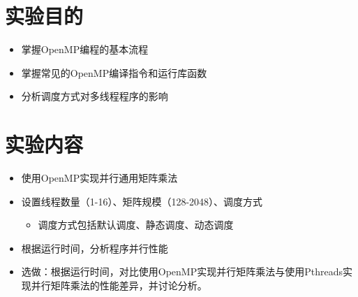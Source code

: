 \documentclass{SYSUReport}
\date{2025年5月4日}
\begin{document}
\cover
\thispagestyle{empty} %
\clearpage



\section{实验目的}
\begin{itemize}
    \item 掌握OpenMP编程的基本流程
    \item 掌握常见的OpenMP编译指令和运行库函数
    \item 分析调度方式对多线程程序的影响
\end{itemize}

\section{实验内容}
\begin{itemize}
 \item 使用OpenMP实现并行通用矩阵乘法
\item 设置线程数量（1-16）、矩阵规模（128-2048）、调度方式
\begin{itemize}
    \item 调度方式包括默认调度、静态调度、动态调度
\end{itemize}
\item 根据运行时间，分析程序并行性能
\item 选做：根据运行时间，对比使用OpenMP实现并行矩阵乘法与使用Pthreads实现并行矩阵乘法的性能差异，并讨论分析。
\end{itemize}
\end{document}
